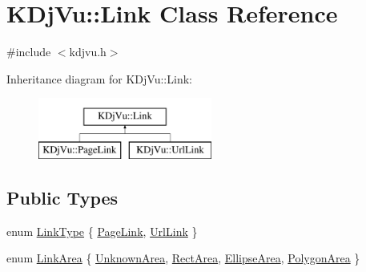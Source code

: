 \hypertarget{classKDjVu_1_1Link}{\section{K\+Dj\+Vu\+:\+:Link Class Reference}
\label{classKDjVu_1_1Link}
}


{\ttfamily \#include $<$kdjvu.\+h$>$}

Inheritance diagram for K\+Dj\+Vu\+:\+:Link\+:\begin{figure}[H]
\begin{center}
\leavevmode
\includegraphics[height=2.000000cm]{classKDjVu_1_1Link}
\end{center}
\end{figure}
\subsection*{Public Types}
\begin{DoxyCompactItemize}
\item 
enum \hyperlink{classKDjVu_1_1Link_aa3462900152831c168c4c62614819b2e}{Link\+Type} \{ \hyperlink{classKDjVu_1_1Link_aa3462900152831c168c4c62614819b2eae69a9d466d98a79238b70196598f6d17}{Page\+Link}, 
\hyperlink{classKDjVu_1_1Link_aa3462900152831c168c4c62614819b2eab9d17f257c3c77f428e805ac04c8a55b}{Url\+Link}
 \}
\item 
enum \hyperlink{classKDjVu_1_1Link_ae7930012fef50123e69d2c97897afd9a}{Link\+Area} \{ \hyperlink{classKDjVu_1_1Link_ae7930012fef50123e69d2c97897afd9aa6c0cf99a52f0b175a8feaaaa76edceeb}{Unknown\+Area}, 
\hyperlink{classKDjVu_1_1Link_ae7930012fef50123e69d2c97897afd9aa6897a602cd1401eb6d0ccc4bd5127ed1}{Rect\+Area}, 
\hyperlink{classKDjVu_1_1Link_ae7930012fef50123e69d2c97897afd9aa47d6a7b999bac1147973a3b3d272516c}{Ellipse\+Area}, 
\hyperlink{classKDjVu_1_1Link_ae7930012fef50123e69d2c97897afd9aa354fba105f6cef2461151c1b9e23024e}{Polygon\+Area}
 \}
\end{DoxyCompactItemize}
